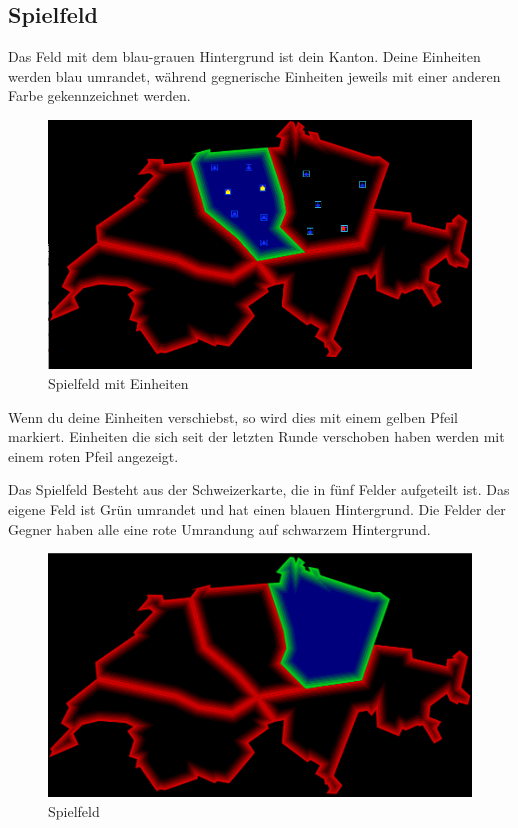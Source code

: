 \documentclass[ngerman, 12pt, pdftex]{scrartcl}[2006/07/30]
\begin{document}
\newpage

\subsection{Spielfeld}
Das Feld mit dem blau-grauen Hintergrund ist dein Kanton. Deine Einheiten werden blau umrandet, während gegnerische Einheiten jeweils mit einer anderen Farbe gekennzeichnet werden.
\begin{figure}[h!]
\centering
\includegraphics[scale=0.4]{spiel/map_with_units.png}
\caption{Spielfeld mit Einheiten}
\end{figure}
Wenn du deine Einheiten verschiebst, so wird dies mit einem gelben Pfeil markiert. Einheiten die sich seit der letzten Runde verschoben haben werden mit einem roten Pfeil angezeigt.

Das Spielfeld Besteht aus der Schweizerkarte, die in fünf Felder aufgeteilt ist. Das eigene Feld ist Grün umrandet und hat einen blauen Hintergrund. Die Felder der Gegner haben alle eine rote Umrandung auf schwarzem Hintergrund.

\begin{figure}[h]
\centering
\includegraphics[scale=0.3]{spiel/spielfeld.png}
\caption{Spielfeld}
\end{figure}
\end{document}
